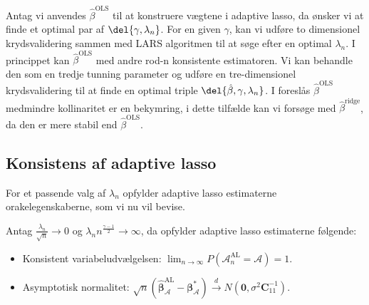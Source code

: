 Antag vi anvendes \(\hat{\beta}^\text{OLS}\) til at konstruere vægtene i adaptive lasso, da ønsker vi at finde et optimal par af \(\del{\gamma, \lambda_n}\).
For en given \(\gamma\), kan vi udføre to dimensionel krydsvalidering sammen med LARS algoritmen til at søge efter en optimal \(\lambda_n\).
I princippet kan \(\hat{\beta}^\text{OLS}\) med andre rod-n konsistente estimatoren.
Vi kan behandle den som en tredje tunning parameter og udføre en tre-dimensionel krydsvalidering til at finde en optimal triple \(\del{\hat{\beta}, \gamma, \lambda_n}\).
I \citep{adaptive_lasso} foreslås \(\hat{\beta}^\text{OLS}\) medmindre kollinaritet er en bekymring, i dette tilfælde kan vi forsøge med \(\hat{\beta}^\text{ridge}\), da den er mere stabil end \(\hat{\beta}^\text{OLS}\).
%
\subsection{Konsistens af adaptive lasso} \label{subsec:konsistentAL}
For et passende valg af \(\lambda_n\) opfylder adaptive lasso estimaterne orakelegenskaberne, som vi nu vil bevise.
%
\begin{thm}\label{thm:ALoracle}
Antag $\frac{\lambda_n}{\sqrt{n}} \rightarrow 0$ og $\lambda_n n^\frac{\gamma-1}{2} \rightarrow \infty$, da opfylder adaptive lasso estimaterne følgende:
\begin{itemize}
\item Konsistent variabeludvælgelsen: $\lim_{n \rightarrow \infty} P(\mathcal{A}_n^\text{AL}=\mathcal{A})=1$.
\item Asymptotisk normalitet: $\sqrt{n}\left( \widehat{\boldsymbol{\beta}}_\mathcal{A}^{\text{AL}}-\boldsymbol{\beta}_\mathcal{A}^* \right) \overset{d}{\rightarrow} N(\textbf{0},\sigma^2 \boldsymbol{C}_{11}^{-1}).$
\end{itemize} 
\end{thm}
%
